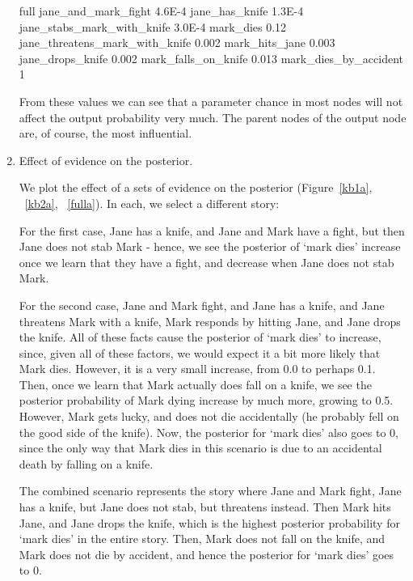 \begin{enumerate}
full
jane\_and\_mark\_fight 	4.6E-4	
jane\_has\_knife	1.3E-4	
jane\_stabs\_mark\_with\_knife	3.0E-4	
mark\_dies 0.12	
jane\_threatens\_mark\_with\_knife	0.002
mark\_hits\_jane	0.003
jane\_drops\_knife	0.002
mark\_falls\_on\_knife	0.013
mark\_dies\_by\_accident	1

From these values we can see that a parameter chance in most nodes will not affect the output probability very much. The parent nodes of the output node are, of course, the most influential. 


\item Effect of evidence on the posterior.

We plot the effect of a sets of evidence on the posterior (Figure~\ref{kb1a}, ~\ref{kb2a}, ~\ref{fulla}). In each, we select a different story: 

For the first case, Jane has a knife, and Jane and Mark have a fight, but then Jane does not stab Mark - hence, we see the posterior of `mark dies' increase once we learn that they have a fight, and decrease when Jane does not stab Mark.

For the second case, Jane and Mark fight, and Jane has a knife, and Jane threatens Mark with a knife, Mark responds by hitting Jane, and Jane drops the knife. All of these facts cause the posterior of `mark dies' to increase, since, given all of these factors, we would expect it a bit more likely that Mark dies. However, it is a very small increase, from 0.0 to perhaps 0.1. Then, once we learn that Mark actually does fall on a knife, we see the posterior probability of Mark dying increase by much more, growing to 0.5. However, Mark gets lucky, and does not die accidentally (he probably fell on the good side of the knife). Now, the posterior for `mark dies' also goes to 0, since the only way that Mark dies in this scenario is due to an accidental death by falling on a knife. 

The combined scenario represents the story where Jane and Mark fight, Jane has a knife, but Jane does not stab, but threatens instead. Then Mark hits Jane, and Jane drops the knife, which is the highest posterior probability for `mark dies' in the entire story. Then, Mark does not fall on the knife, and Mark does not die by accident, and hence the posterior for `mark dies' goes to 0.

\begin{figure}[htbp]


\end{figure}
\end{enumerate}
